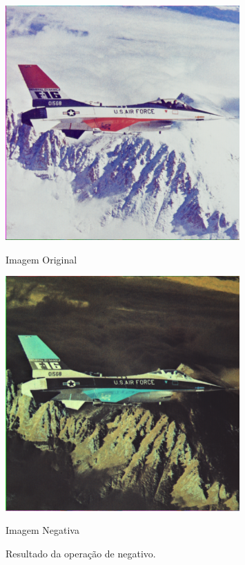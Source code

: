 \documentclass[a4paper, 11pt, portuguese]{article}
\begin{document}
\begin{figure}[htbp]
\centering
\begin{minipage}{0.48\textwidth}
    \centering
    \includegraphics[width=0.8\textwidth]{imagens/airplane.png}
    \caption*{Imagem Original}
\end{minipage}
\hfill
\begin{minipage}{0.48\textwidth}
    \centering
    \includegraphics[width=0.8\textwidth]{imagens/airplane_neg.png}
    \caption*{Imagem Negativa}
\end{minipage}
\caption{Resultado da operação de negativo.}
\label{fig:negativo}
\end{figure}
\end{document}
